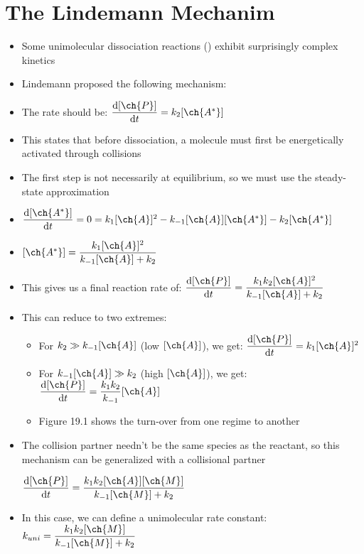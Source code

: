 \documentclass[12pt, openany, letterpaper]{memoir}
\begin{document}
\section*{The Lindemann Mechanim}
\begin{itemize}
	\item Some unimolecular dissociation reactions () exhibit surprisingly complex kinetics
	\item Lindemann proposed the following mechanism:
	
	
	\item The rate should be: $\dfrac{\mathrm{d}[\ch{P}]}{\mathrm{d}t} = k_2[\ch{A^*}]$
	\item This states that before dissociation, a molecule must first be energetically activated through collisions
	\item The first step is not necessarily at equilibrium, so we must use the steady-state approximation
	\item $\dfrac{\mathrm{d}[\ch{A^*}]}{\mathrm{d}t} = 0 = k_1[\ch{A}]^2 - k_{-1}[\ch{A}][\ch{A^*}] - k_2[\ch{A^*}]$
	\item $[\ch{A^*}] = \dfrac{k_1[\ch{A}]^2}{k_{-1}[\ch{A}]+k_2}$
	\item This gives us a final reaction rate of: $\dfrac{\mathrm{d}[\ch{P}]}{\mathrm{d}t} = \dfrac{k_1k_2[\ch{A}]^2}{k_{-1}[\ch{A}]+k_2}$
	\item This can reduce to two extremes:
	\begin{itemize}
		\item For $k_2\gg k_{-1}[\ch{A}]$ (low $[\ch{A}]$), we get: $\dfrac{\mathrm{d}[\ch{P}]}{\mathrm{d}t} = k_1[\ch{A}]^2$
		\item For $k_{-1}[\ch{A}]\gg k_2$ (high $[\ch{A}]$), we get: $\dfrac{\mathrm{d}[\ch{P}]}{\mathrm{d}t} = \dfrac{k_1k_2}{k_{-1}}[\ch{A}]$
		\item Figure 19.1 shows the turn-over from one regime to another
	\end{itemize}
	\item The collision partner needn't be the same species as the reactant, so this mechanism can be generalized with a collisional partner 
	
	$\dfrac{\mathrm{d}[\ch{P}]}{\mathrm{d}t} = \dfrac{k_1k_2[\ch{A}][\ch{M}]}{k_{-1}[\ch{M}]+k_2}$
	\item In this case, we can define a unimolecular rate constant: $k_{uni} = \dfrac{k_1k_2[\ch{M}]}{k_{-1}[\ch{M}] + k_2}$
\end{itemize}
\end{document}
